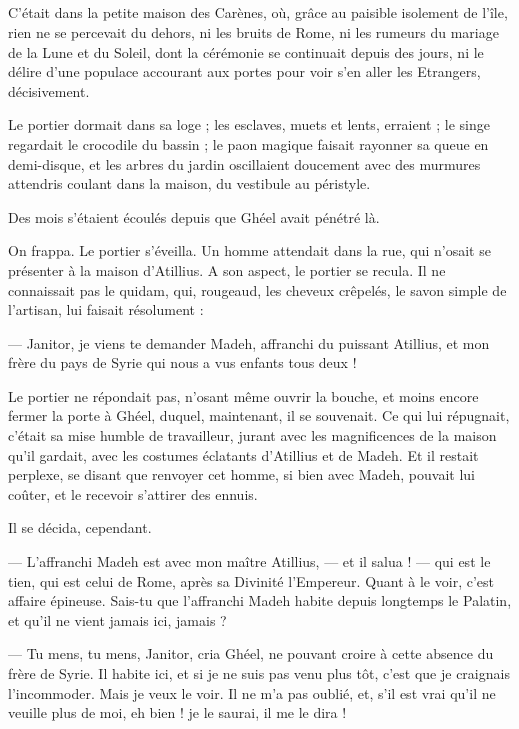 \documentclass[a4paper, 11pt, oneside, polutonikogreek, french]{article}
\begin{document}
\subsection{}
\paragraph{}
C'était dans la petite maison des Carènes, où, grâce au paisible isolement de l'île, rien ne se percevait du dehors, ni les bruits de Rome, ni les rumeurs du mariage de la Lune et du Soleil, dont la cérémonie se continuait depuis des jours, ni le délire d'une populace accourant aux portes pour voir s'en aller les Etrangers, décisivement.

Le portier dormait dans sa loge ; les esclaves, muets et lents, erraient ; le singe regardait le crocodile du bassin ; le paon magique faisait rayonner sa queue en demi-disque, et les arbres du jardin oscillaient doucement avec des murmures attendris coulant dans la maison, du vestibule au péristyle.

Des mois s'étaient écoulés depuis que Ghéel avait pénétré là.

On frappa. Le portier s'éveilla. Un homme attendait dans la rue, qui n'osait se présenter à la maison d'Atillius. A son aspect, le portier se recula. Il ne connaissait pas le quidam, qui, rougeaud, les cheveux crêpelés, le savon simple de l'artisan, lui faisait résolument :

--- Janitor, je viens te demander Madeh, affranchi du puissant Atillius, et mon frère du pays de Syrie qui nous a vus enfants tous deux !

Le portier ne répondait pas, n'osant même ouvrir la bouche, et moins encore fermer la porte à Ghéel, duquel, maintenant, il se souvenait. Ce qui lui répugnait, c'était sa mise humble de travailleur, jurant avec les magnificences de la maison qu'il gardait, avec les costumes éclatants d'Atillius et de Madeh. Et il restait perplexe, se disant que renvoyer cet homme, si bien avec Madeh, pouvait lui coûter, et le recevoir s'attirer des ennuis.

Il se décida, cependant.

--- L'affranchi Madeh est avec mon maître Atillius, --- et il salua ! --- qui est le tien, qui est celui de Rome, après sa Divinité l'Empereur. Quant à le voir, c'est affaire épineuse. Sais-tu que l'affranchi Madeh habite depuis longtemps le Palatin, et qu'il ne vient jamais ici, jamais ?

--- Tu mens, tu mens, Janitor, cria Ghéel, ne pouvant croire à cette absence du frère de Syrie. Il habite ici, et si je ne suis pas venu plus tôt, c'est que je craignais l'incommoder. Mais je veux le voir. Il ne m'a pas oublié, et, s'il est vrai qu'il ne veuille plus de moi, eh bien ! je le saurai, il me le dira !
\end{document}
